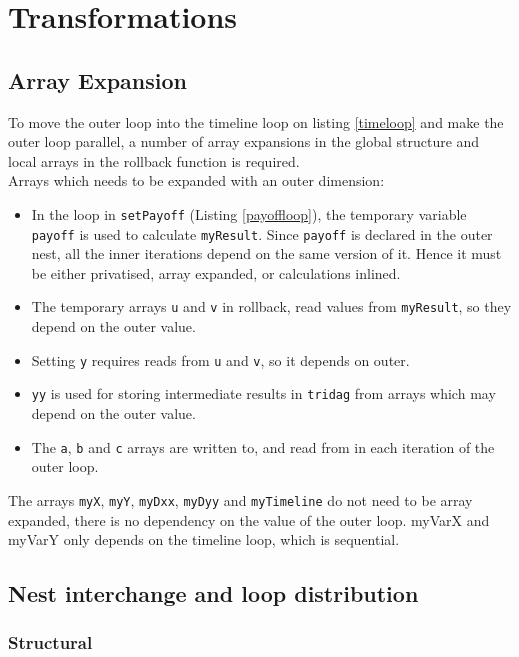 \section{Transformations}

\subsection{Array Expansion}
\label{sec:arrayexp}
To move the outer loop into the timeline loop on listing \ref{timeloop} and make the outer loop parallel, a number of array expansions in the global structure and local arrays in the rollback function is required.\\
Arrays which needs to be expanded with an outer dimension:
\begin{itemize}
\item In the loop in \verb!setPayoff! (Listing \ref{payoffloop}), the temporary variable \verb!payoff! is used to calculate
 \verb!myResult!. Since \verb!payoff! is declared in the outer nest, all the inner iterations depend on the same version of it. Hence
 it must be either privatised, array expanded, or calculations inlined.
\item The temporary arrays \verb!u! and \verb!v! in rollback, read values from \verb!myResult!, so they depend on the outer value.
\item Setting \verb!y! requires reads from \verb!u! and \verb!v!, so it depends on outer.
\item \verb!yy! is used for storing intermediate results in \verb!tridag! from arrays which may depend on the outer value.
\item The \verb!a!, \verb!b! and \verb!c! arrays are written to, and read from in each iteration of the outer loop.
\end{itemize}

The arrays \verb!myX!, \verb!myY!, \verb!myDxx!, \verb!myDyy! and \verb!myTimeline! do not need to be array expanded, there is no dependency on the value of the outer loop. myVarX and myVarY only depends on the timeline loop, which is sequential.

\subsection{Nest interchange and loop distribution}

\subsubsection{Structural}
